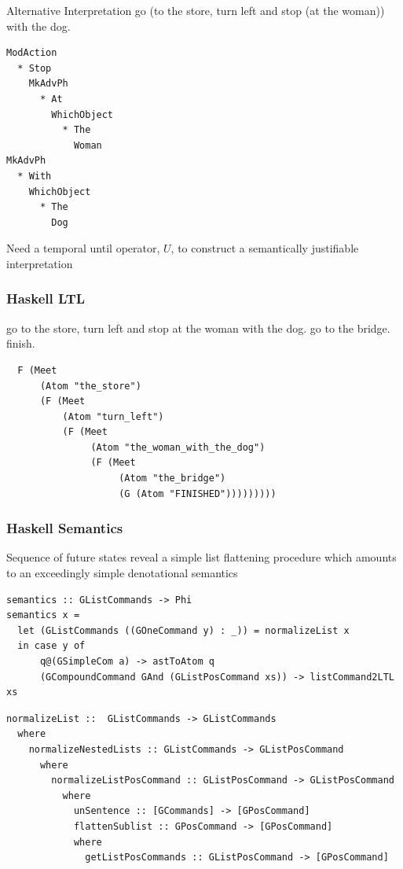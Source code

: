 \documentclass{beamer}
\begin{document}
\begin{frame}[fragile]
\begin{exampleblock}{Alternative Interpretation}
go (to the store, turn left and stop (at the woman)) with the dog. 
\end{exampleblock}
\pause
\begin{verbatim}
ModAction
  * Stop
    MkAdvPh
      * At
        WhichObject
          * The
            Woman
MkAdvPh
  * With
    WhichObject
      * The
        Dog
\end{verbatim}
\pause
\begin{alertblock}{}
Need a temporal until operator, $U$, to construct a semantically justifiable interpretation
\end{alertblock}
\end{frame}


\begin{frame}[fragile]
\frametitle{Haskell LTL}

\fontsize{9pt}{10pt}\selectfont
\begin{exampleblock}{}
go to the store, turn left and stop at the woman with the dog. go to the bridge.
finish.
\end{exampleblock}

\begin{verbatim}
  F (Meet
      (Atom "the_store")
      (F (Meet
          (Atom "turn_left")
          (F (Meet
               (Atom "the_woman_with_the_dog")
               (F (Meet
                    (Atom "the_bridge")
                    (G (Atom "FINISHED")))))))))
\end{verbatim}
\end{frame}

\begin{frame}[fragile]
\frametitle{Haskell Semantics}
\fontsize{9pt}{10pt}\selectfont
\begin{block}{}
Sequence of future states reveal a simple list flattening procedure which
amounts to an exceedingly simple denotational semantics
\end{block}
\pause
\begin{verbatim}
semantics :: GListCommands -> Phi
semantics x =
  let (GListCommands ((GOneCommand y) : _)) = normalizeList x
  in case y of
      q@(GSimpleCom a) -> astToAtom q
      (GCompoundCommand GAnd (GListPosCommand xs)) -> listCommand2LTL xs
\end{verbatim}
\pause
\begin{verbatim}
normalizeList ::  GListCommands -> GListCommands
  where
    normalizeNestedLists :: GListCommands -> GListPosCommand
      where
        normalizeListPosCommand :: GListPosCommand -> GListPosCommand
          where
            unSentence :: [GCommands] -> [GPosCommand]
            flattenSublist :: GPosCommand -> [GPosCommand]
            where
              getListPosCommands :: GListPosCommand -> [GPosCommand]
\end{verbatim}
\end{frame}
\end{document}
